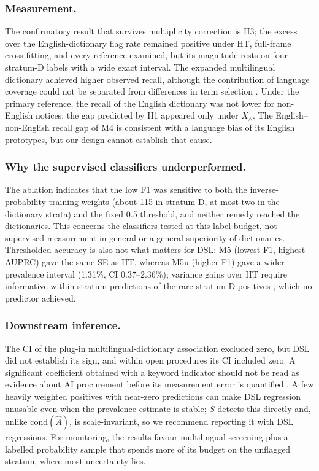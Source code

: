\documentclass[runningheads]{llncs}
\begin{document}
\subsubsection{Measurement.} The confirmatory result that survives multiplicity correction is H3; the excess over the English-dictionary flag rate remained positive under HT, full-frame cross-fitting, and every reference examined, but its magnitude rests on four stratum-D labels with a wide exact interval. The expanded multilingual dictionary achieved higher observed recall, although the contribution of language coverage could not be separated from differences in term selection \cite{gentzkow2019}. Under the primary reference, the recall of the English dictionary was not lower for non-English notices; the gap predicted by H1 appeared only under $X_\wedge$. The English--non-English recall gap of M4 is consistent with a language bias of its English prototypes, but our design cannot establish that cause.

\subsubsection{Why the supervised classifiers underperformed.} The ablation indicates that the low F1 was sensitive to both the inverse-probability training weights (about 115 in stratum D, at most two in the dictionary strata) and the fixed 0.5 threshold, and neither remedy reached the dictionaries. This concerns the classifiers tested at this label budget, not supervised measurement in general or a general superiority of dictionaries. Thresholded accuracy is also not what matters for DSL: M5 (lowest F1, highest AUPRC) gave the same SE as HT, whereas M5u (higher F1) gave a wider prevalence interval (1.31\%, CI 0.37--2.36\%); variance gains over HT require informative within-stratum predictions of the rare stratum-D positives \cite{egami2023,audinet2025}, which no predictor achieved.

\subsubsection{Downstream inference.} The CI of the plug-in multilingual-dictionary association excluded zero, but DSL did not establish its sign, and within open procedures its CI included zero. A significant coefficient obtained with a keyword indicator should not be read as evidence about AI procurement before its measurement error is quantified \cite{battaglia2025}. A few heavily weighted positives with near-zero predictions can make DSL regression unusable even when the prevalence estimate is stable; $S$ detects this directly and, unlike $\mathrm{cond}(\hat{A})$, is scale-invariant, so we recommend reporting it with DSL regressions. For monitoring, the results favour multilingual screening plus a labelled probability sample that spends more of its budget on the unflagged stratum, where most uncertainty lies.
\end{document}

